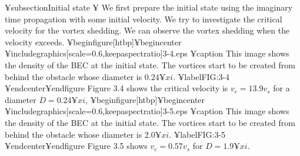 {{{¥subsection{Initial state}
¥ We first prepare the initial state using the imaginary time propagation with some initial velocity.
We try to investigate the critical velocity for the vortex shedding.
We can observe the vortex shedding when the velocity exceeds.
¥begin{figure}[htbp]¥begin{center}
¥includegraphics[scale=0.6,keepaspectratio]{3-4.eps}
¥caption{
This image shows the density of the BEC at the initial state.
The vortices start to be created from behind the obstacle whose diameter is $0.24¥xi$.
}
¥label{FIG:3-4}
¥end{center}¥end{figure}
Figure 3.4 shows the critical velocity is $v_c = 13.9v_s$ for a diameter $D = 0.24¥xi$,
¥begin{figure}[htbp]¥begin{center}
¥includegraphics[scale=0.6,keepaspectratio]{3-5.eps}
¥caption{
This image shows the density of the BEC at the initial state.
The vortices start to be created from behind the obstacle whose diameter is $2.0¥xi$.
}
¥label{FIG:3-5}
¥end{center}¥end{figure}
Figure 3.5 shows $v_c = 0.57v_s$ for $D = 1.9¥xi$.

}}}
